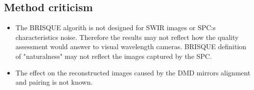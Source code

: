\pagebreak



\subsection{Method criticism}
\begin{itemize}
    \item The BRISQUE algorith is not designed for SWIR images or SPC:s characteristics noise. Therefore the results may not reflect how the quality assessment would answer to visual wavelength cameras. BRISQUE definition of "naturalness" may not reflect the images captured by the SPC. 
    \item The effect on the reconstructed images caused by the DMD mirrors alignment and pairing is not known.
\end{itemize}

